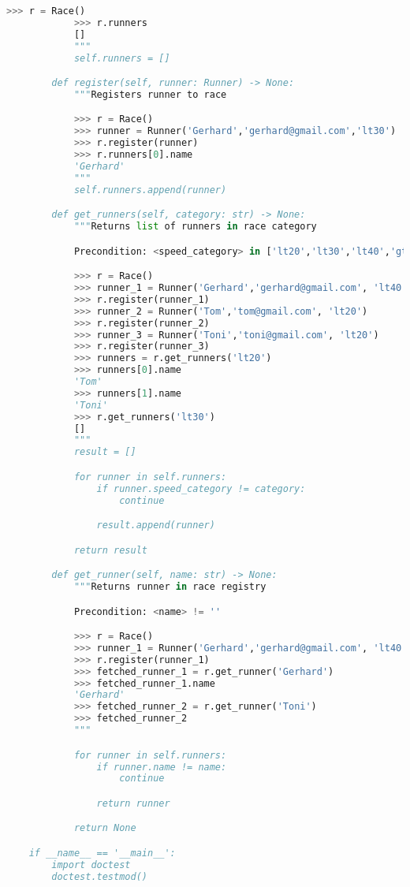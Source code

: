 \documentclass[12pt]{article}
\begin{document}
\begin{lstlisting}[language=Python]
            >>> r = Race()
            >>> r.runners
            []
            """
            self.runners = []

        def register(self, runner: Runner) -> None:
            """Registers runner to race

            >>> r = Race()
            >>> runner = Runner('Gerhard','gerhard@gmail.com','lt30')
            >>> r.register(runner)
            >>> r.runners[0].name
            'Gerhard'
            """
            self.runners.append(runner)

        def get_runners(self, category: str) -> None:
            """Returns list of runners in race category

            Precondition: <speed_category> in ['lt20','lt30','lt40','gt40']

            >>> r = Race()
            >>> runner_1 = Runner('Gerhard','gerhard@gmail.com', 'lt40')
            >>> r.register(runner_1)
            >>> runner_2 = Runner('Tom','tom@gmail.com', 'lt20')
            >>> r.register(runner_2)
            >>> runner_3 = Runner('Toni','toni@gmail.com', 'lt20')
            >>> r.register(runner_3)
            >>> runners = r.get_runners('lt20')
            >>> runners[0].name
            'Tom'
            >>> runners[1].name
            'Toni'
            >>> r.get_runners('lt30')
            []
            """
            result = []

            for runner in self.runners:
                if runner.speed_category != category:
                    continue

                result.append(runner)

            return result

        def get_runner(self, name: str) -> None:
            """Returns runner in race registry

            Precondition: <name> != ''

            >>> r = Race()
            >>> runner_1 = Runner('Gerhard','gerhard@gmail.com', 'lt40')
            >>> r.register(runner_1)
            >>> fetched_runner_1 = r.get_runner('Gerhard')
            >>> fetched_runner_1.name
            'Gerhard'
            >>> fetched_runner_2 = r.get_runner('Toni')
            >>> fetched_runner_2
            """

            for runner in self.runners:
                if runner.name != name:
                    continue

                return runner

            return None

    if __name__ == '__main__':
        import doctest
        doctest.testmod()


\end{lstlisting}
\end{document}
